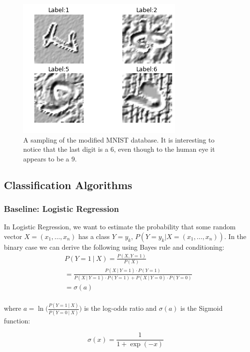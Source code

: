 \documentclass[conference]{IEEEtran}
\begin{document}
\begin{figure}[h]
	\centering
	\includegraphics[scale=0.40]{sample_of_images.png}
	\caption{A sampling of the modified MNIST database. It is interesting to notice that the last digit is a 6, even though to the human eye it appears to be a 9.}
	\label{MNISTSample}
\end{figure}

\subsection{Classification Algorithms}

\subsubsection{Baseline: Logistic Regression}
In Logistic Regression, we want to estimate the probability that some random vector $X=(x_1, \ldots, x_n)$ has a class $Y=y_k$, $P(Y=y_k | X=(x_1, \ldots, x_n))$. In the binary case we can derive the following using Bayes rule and conditioning:
\begin{equation*}
\begin{split}
&P(Y=1~|~X) = \frac{P(X, Y=1)}{P(X)}\\
&= \frac{ P(X~|~Y=1)\cdot P(Y=1) }{ P(X~|~Y=1)\cdot P(Y=1) + P(X~|~Y=0)\cdot P(Y=0) }\\
& = \sigma(a)\\
\end{split}
\end{equation*}

where $a=\ln\Big(\frac{P(Y=1~|~X)}{P(Y=0~|~X)}\Big)$ is the log-odds ratio and $\sigma (a)$ is the Sigmoid function:

\begin{equation}
	\label{sig}
	\sigma (x)= \frac{1}{1 + \exp{(-x)}} 
\end{equation}
\end{document}
